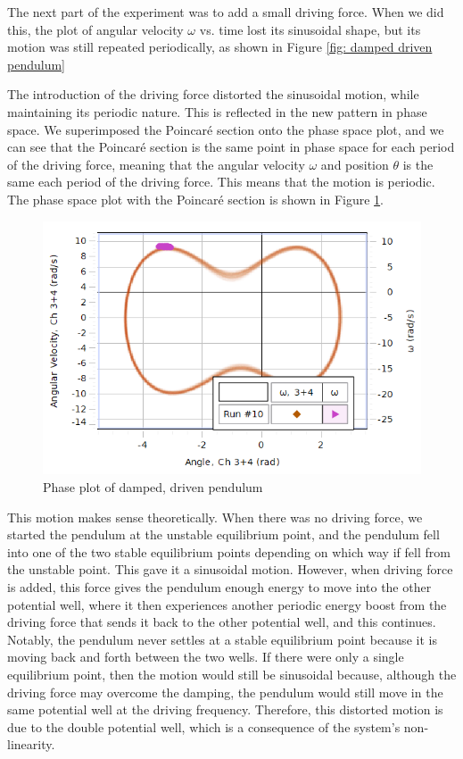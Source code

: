\documentclass[twocolumn,amsmath,amssymb,pra, floatfix]{revtex4-2}
\begin{document}
The next part of the experiment was to add a small driving force. When we did this, the plot of angular velocity $\omega$ vs. time lost its sinusoidal shape, but its motion was still repeated periodically, as shown in Figure \ref{fig: damped driven pendulum}

The introduction of the driving force distorted the sinusoidal motion, while maintaining its periodic nature. This is reflected in the new pattern in phase space. We superimposed the Poincar\'{e} section onto the phase space plot, and we can see that the Poincar\'{e} section is the same point in phase space for each period of the driving force, meaning that the angular velocity $\omega$ and position $\theta$ is the same each period of the driving force. This means that the motion is periodic. The phase space plot with the Poincar\'{e} section is shown in Figure \ref{fig: phase plot damped driven pendulum}.

\begin{figure}[H]
    \centering
    \includegraphics[width = 0.7\linewidth]{images/NonChaoticOmegavsAngle.PNG}
    \caption{Phase plot of damped, driven pendulum}
    \label{fig: phase plot damped driven pendulum}
\end{figure}

This motion makes sense theoretically. When there was no driving force, we started the pendulum at the unstable equilibrium point, and the pendulum fell into one of the two stable equilibrium points depending on which way if fell from the unstable point. This gave it a sinusoidal motion. However, when driving force is added, this force gives the pendulum enough energy to move into the other potential well, where it then experiences another periodic energy boost from the driving force that sends it back to the other potential well, and this continues. Notably, the pendulum never settles at a stable equilibrium point because it is moving back and forth between the two wells. If there were only a single equilibrium point, then the motion would still be sinusoidal because, although the driving force may overcome the damping, the pendulum would still move in the same potential well at the driving frequency. Therefore, this distorted motion is due to the double potential well, which is a consequence of the system's non-linearity. 
\end{document}

